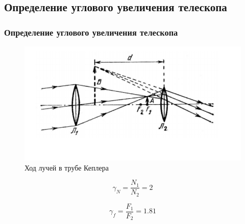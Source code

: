 \documentclass[10pt,pdf,hyperref={unicode}]{beamer}
\begin{document}
\begin{frame}
\section{Определение углового увеличения телескопа}
\frametitle{Определение углового увеличения телескопа} 


\begin{figure}[H]
	\centering
	\includegraphics[width=0.6\linewidth]{7}
	\caption{Ход лучей в трубе Кеплера}
	\label{fig:4_1}
\end{figure}




\begin{equation}
	\gamma_N = \frac{N_1}{N_2} = 2
\end{equation}

\begin{equation*}
	\gamma_f = \frac{F_1}{F_2} = 1.81
\end{equation*}
\end{frame}
\end{document}

